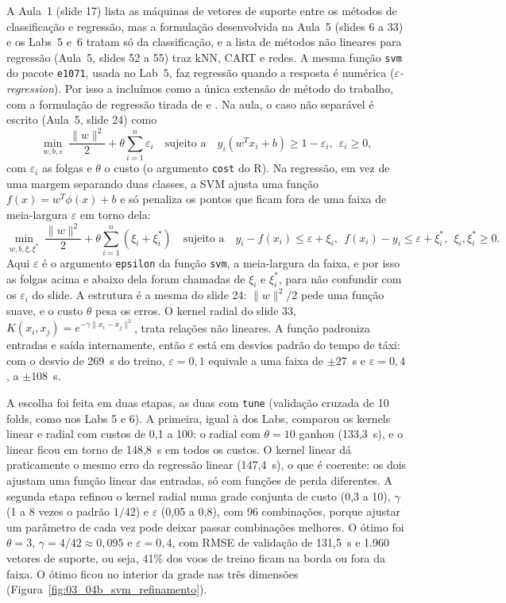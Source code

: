\documentclass[12pt,a4paper]{article}
\begin{document}
A Aula~1 (slide 17) lista as máquinas de vetores de suporte entre os métodos de classificação e regressão, mas a formulação desenvolvida na Aula~5 (slides 6 a 33) e os Labs~5 e~6 tratam só da classificação, e a lista de métodos não lineares para regressão (Aula~5, slides 52 a 55) traz kNN, CART e redes. A mesma função \texttt{svm} do pacote \texttt{e1071}, usada no Lab~5, faz regressão quando a resposta é numérica (\textit{$\varepsilon$-regression}). Por isso a incluímos como a única extensão de método do trabalho, com a formulação de regressão tirada de \citet{drucker1997} e \citet{smola2004}. Na aula, o caso não separável é escrito (Aula~5, slide 24) como
\[
\min_{w,b,\varepsilon}\ \frac{\lVert w\rVert^2}{2} + \theta\sum_{i=1}^{n}\varepsilon_i
\quad\text{sujeito a}\quad y_i(w^{T}x_i+b)\ge 1-\varepsilon_i,\ \ \varepsilon_i\ge 0,
\]
com $\varepsilon_i$ as folgas e $\theta$ o custo (o argumento \texttt{cost} do R). Na regressão, em vez de uma margem separando duas classes, a SVM ajusta uma função $f(x)=w^{T}\phi(x)+b$ e só penaliza os pontos que ficam fora de uma faixa de meia-largura $\varepsilon$ em torno dela:
\[
\min_{w,b,\xi,\xi^*}\ \frac{\lVert w\rVert^2}{2} + \theta\sum_{i=1}^{n}(\xi_i+\xi_i^*)
\quad\text{sujeito a}\quad
y_i - f(x_i) \le \varepsilon+\xi_i,\ \ f(x_i)-y_i \le \varepsilon+\xi_i^*,\ \ \xi_i,\xi_i^*\ge 0.
\]
Aqui $\varepsilon$ é o argumento \texttt{epsilon} da função \texttt{svm}, a meia-largura da faixa, e por isso as folgas acima e abaixo dela foram chamadas de $\xi_i$ e $\xi_i^*$, para não confundir com os $\varepsilon_i$ do slide. A estrutura é a mesma do slide 24: $\lVert w\rVert^2/2$ pede uma função suave, e o custo $\theta$ pesa os erros. O kernel radial do slide 33, $K(x_i,x_j)=e^{-\gamma\lVert x_i-x_j\rVert^2}$, trata relações não lineares. A função padroniza entradas e saída internamente, então $\varepsilon$ está em desvios padrão do tempo de táxi: com o desvio de 269~s do treino, $\varepsilon=0{,}1$ equivale a uma faixa de $\pm27$~s e $\varepsilon=0{,}4$, a $\pm108$~s.

A escolha foi feita em duas etapas, as duas com \texttt{tune} (validação cruzada de 10 folds, como nos Labs 5 e 6). A primeira, igual à dos Labs, comparou os kernels linear e radial com custos de 0,1 a 100: o radial com $\theta=10$ ganhou (133,3~s), e o linear ficou em torno de 148,8~s em todos os custos. O kernel linear dá praticamente o mesmo erro da regressão linear (147,4~s), o que é coerente: os dois ajustam uma função linear das entradas, só com funções de perda diferentes. A segunda etapa refinou o kernel radial numa grade conjunta de custo (0,3 a 10), $\gamma$ (1 a 8 vezes o padrão $1/42$) e $\varepsilon$ (0,05 a 0,8), com 96 combinações, porque ajustar um parâmetro de cada vez pode deixar passar combinações melhores. O ótimo foi $\theta=3$, $\gamma=4/42\approx0{,}095$ e $\varepsilon=0{,}4$, com RMSE de validação de 131,5~s e 1.960 vetores de suporte, ou seja, 41\% dos voos de treino ficam na borda ou fora da faixa. O ótimo ficou no interior da grade nas três dimensões (Figura~\ref{fig:03_04b_svm_refinamento}).
\end{document}
